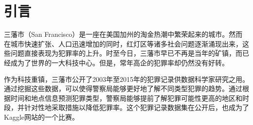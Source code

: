 \section{引言}
\label{sec:intro}

三藩市（San Francisco）是一座在美国加州的淘金热潮中繁荣起来的城市。然而在城市快速扩张、人口迅速增加的同时，红灯区等诸多社会问题逐渐涌现出来，这些问题直接表现为犯罪率的上升。时至今日，三藩市早已不再是当年的矿镇，而已经成为了世界的一大科技中心。但是，常年高企的犯罪率却仍然没有好转。

作为科技重镇，三藩市公开了2003年至2015年的犯罪记录供数据科学家研究之用。通过挖掘这些数据，可以使得警察局能够更好地了解不同类型犯罪的趋势。通过根据时间和地点信息预测犯罪类型，警察局能够提前了解犯罪可能性更高的地区和时段，并针对性地采取措施以降低犯罪率。这个犯罪记录数据集在公开后，也成为了Kaggle网站的一个比赛。

